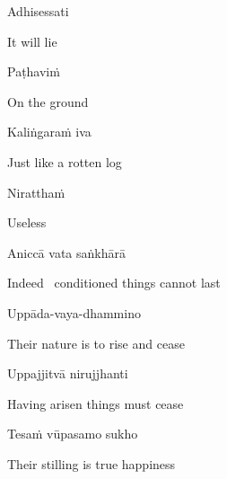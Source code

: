 Adhisessati

\begin{english}
  It will lie
\end{english}

Paṭhaviṁ

\begin{english}
  On the ground
\end{english}

Kaliṅgaraṁ iva

\begin{english}
  Just like a rotten log
\end{english}

Niratthaṁ

\begin{english}
  Useless\makeatletter\hyperlink{endnote105-appendix}\makeatother
\end{english}

\suttaRef{[Dhp 41]}

Aniccā vata saṅkhārā

\begin{english}
  Indeed \breathmark\ conditioned things cannot last
\end{english}

Uppāda-vaya-dhammino

\begin{english}
  Their nature is to rise and cease\makeatletter\hyperlink{endnote106-appendix}\makeatother
\end{english}

Uppajjitvā nirujjhanti

\begin{english}
  Having arisen things must cease
\end{english}

Tesaṁ vūpasamo sukho

\begin{english}
  Their stilling is true happiness
\end{english}

\suttaRef{[Trad]}

